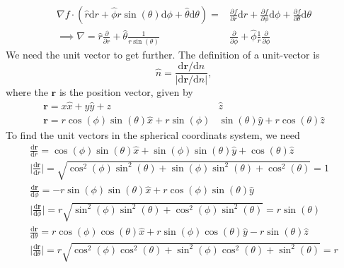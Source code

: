 \documentclass{article}
\begin{document}
    \begin{align*}
        \nabla f \cdot (\hat r \mathrm{d}r + \hat \phi r \sin(\theta) \mathrm{d} \phi + \hat \theta \mathrm{d} \theta) = & \frac{\partial f}{\partial r} \mathrm{d}r + \frac{\partial f}{\partial \phi} \mathrm{d}\phi + \frac{\partial f}{\partial \theta} \mathrm{d}\theta \\
        \implies \nabla = \hat r \frac{\partial }{\partial r} + \hat \theta \frac{1}{r \sin(\theta)} & \frac{\partial}{\partial \phi} + \hat \phi \frac{1}{r} \frac{\partial}{\partial \phi}            
    \end{align*}
    We need the unit vector to get further. The definition of a unit-vector is 
    \begin{equation*}
        \hat n = \frac{\mathrm{d}  \pmb{r} / \mathrm{d} n}{|\mathrm{d}   \pmb{r} / \mathrm{d} n|},
    \end{equation*}
    where the \(\pmb{r}\) is the position vector, given by
        \begin{align*}
            \pmb{r} = x \hat x + y \hat y + z & \hat z \\
            \pmb{r} = r \cos (\phi) \sin(\theta) \hat x + r \sin (\phi) & \sin(\theta) \hat y + r \cos(\theta) \hat z
        \end{align*}
    To find the unit vectors in the spherical coordinats system, we need
    \begin{align*}
        \frac{\mathrm{d} \pmb{r}}{\mathrm{d} r} = \cos (\phi) \sin(\theta) \hat x + \sin (\phi) \sin(\theta) \hat y + \cos (\theta) \hat z \\
        \bigg| \frac{\mathrm{d} \pmb{r}}{\mathrm{d} r} \bigg| = \sqrt{\cos^2(\phi) \sin^2(\theta)  + \sin (\phi) \sin^2(\theta) + \cos^2 (\theta) } = 1 \\
        \frac{\mathrm{d} \pmb{r}}{\mathrm{d} \phi} = - r \sin{(\phi)} \sin{(\theta)} \hat x + r \cos{(\phi)} \sin{(\theta)} \hat y \\
        \bigg|\frac{\mathrm{d} \pmb{r}}{\mathrm{d} \phi}\bigg| = r \sqrt{\sin^2{(\phi)} \sin^2{(\theta)} + \cos^2{(\phi)} \sin^2{(\theta)} } = r \sin{(\theta)} \\
        \frac{\mathrm{d} \pmb{r}}{\mathrm{d} \theta} = r \cos(\phi) \cos(\theta) \hat x + r \sin(\phi)\cos(\theta) \hat y - r \sin(\theta) \hat z \\
        \bigg|\frac{\mathrm{d} \pmb{r}}{\mathrm{d} \theta}\bigg| = r \sqrt{\cos^2(\phi) \cos^2(\theta) + \sin^2(\phi)\cos^2(\theta) + \sin^2(\theta)} = r
    \end{align*}
\end{document}
